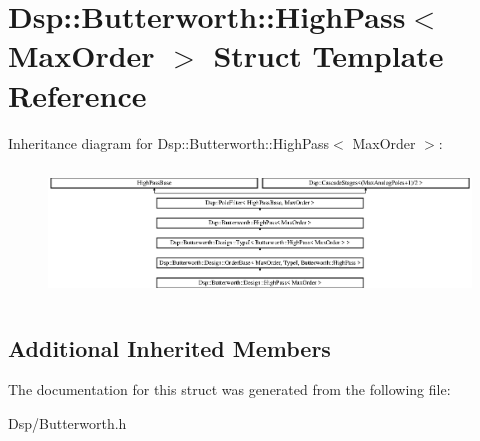 \hypertarget{structDsp_1_1Butterworth_1_1HighPass}{\section{Dsp\-:\-:Butterworth\-:\-:High\-Pass$<$ Max\-Order $>$ Struct Template Reference}
\label{structDsp_1_1Butterworth_1_1HighPass}
}
Inheritance diagram for Dsp\-:\-:Butterworth\-:\-:High\-Pass$<$ Max\-Order $>$\-:\begin{figure}[H]
\begin{center}
\leavevmode
\includegraphics[height=3.507307cm]{structDsp_1_1Butterworth_1_1HighPass}
\end{center}
\end{figure}
\subsection*{Additional Inherited Members}


The documentation for this struct was generated from the following file\-:\begin{DoxyCompactItemize}
\item 
Dsp/Butterworth.\-h\end{DoxyCompactItemize}
